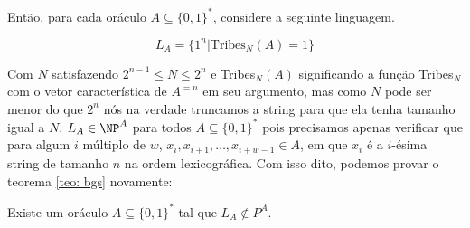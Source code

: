 Então, para cada oráculo $A \subseteq \{0, 1\}^{*}$, considere a seguinte linguagem.

\begin{equation*}
L_{A} = \{1^{n} \lvert \text{Tribes}_{N}(A) = 1\}
\end{equation*}

Com $N$ satisfazendo $2^{n - 1} \leq N \leq 2^{n}$ e Tribes$_{N}(A)$ significando a função Tribes$_{N}$ com o vetor característica de $A^{=n}$ em seu argumento, mas como $N$ pode ser menor do que $2^{n}$ nós na verdade truncamos a string para que ela tenha tamanho igual a $N$. $L_{A} \in \NP^{A}$ para todos $A \subseteq \{0, 1\}^{*}$ pois precisamos apenas verificar que para algum $i$ múltiplo de $w$, $x_{i}, x_{i + 1}, \dots, x_{i + w - 1} \in A$, em que $x_{i}$ é a $i$-ésima string de tamanho $n$ na ordem lexicográfica. Com isso dito, podemos provar o teorema \ref{teo: bgs} novamente:

\begin{prop} \label{prop: p_vs_np_r}

Existe um oráculo $A \subseteq \{0, 1\}^{*}$ tal que $L_{A} \notin P^{A}$.

\end{prop}

